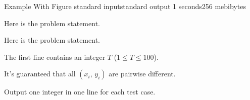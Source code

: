 \begin{problem}{Example With Figure}
{standard input}{standard output}
{1 seconds}{256 mebibytes}{}

Here is the problem statement.


Here is the problem statement.

\InputFile

The first line contains an integer $T$ ($1 \leq T \leq 100$).

It's guaranteed that all $(x_i,\,y_i)$ are pairwise different.

\OutputFile

Output one integer in one line for each test case.

\Examples

\begin{example}
%
\end{example}


\end{problem}
